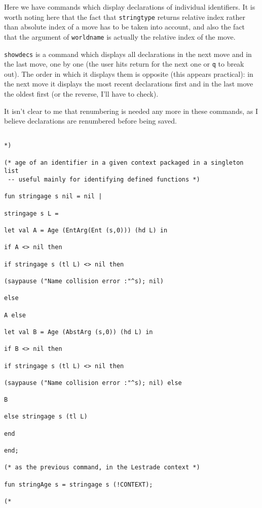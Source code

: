 \documentclass{article}
\begin{document}
Here we have commands which display declarations of individual identifiers.  It is worth noting here that the fact that {\tt stringtype} returns relative index rather than absolute index of a move has to be taken into account, and also the fact that the argument of {\tt worldname} is actually the relative index of the move.

{\tt showdecs} is a command which displays all declarations in the next move and in the last move, one by one (the user hits return for the next one or {\tt q} to break out).   The order in which it displays them is opposite (this appears practical):  in the next move it displays the most recent declarations first and in the last move the oldest first (or the reverse, I'll have to check).

It isn't clear to me that renumbering is needed any more in these commands, as I believe declarations are renumbered before being saved.

\begin{verbatim}

*)

(* age of an identifier in a given context packaged in a singleton list
 -- useful mainly for identifying defined functions *)

fun stringage s nil = nil |

stringage s L =

let val A = Age (EntArg(Ent (s,0))) (hd L) in

if A <> nil then 

if stringage s (tl L) <> nil then

(saypause ("Name collision error :"^s); nil)

else

A else

let val B = Age (AbstArg (s,0)) (hd L) in

if B <> nil then 

if stringage s (tl L) <> nil then 

(saypause ("Name collision error :"^s); nil) else

B

else stringage s (tl L)

end

end;

(* as the previous command, in the Lestrade context *)

fun stringAge s = stringage s (!CONTEXT);

(*

\end{verbatim}
\end{document}
